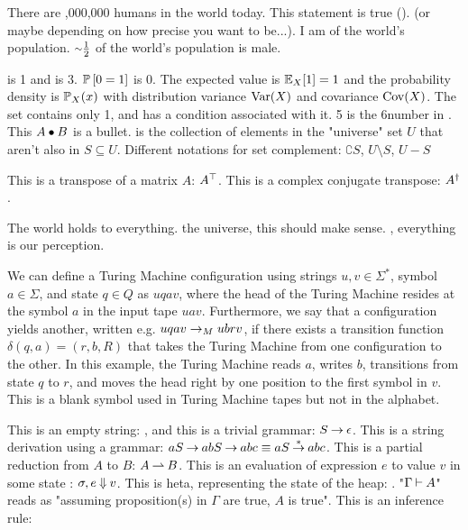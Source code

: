 \documentclass{article}
\begin{document}
\begin{solution}
    \par There are ,000,000 humans in the world today. This statement is true (\true). (or maybe \false depending on how precise you want to be...). I am  of the world's population. $\approx\half$ of the world's population is male.
    \par {} is 1 and  is 3. $\operatorname{\mathbb{P}}{[0=1]}$ is 0. The expected value is $\operatorname{\mathbb{E}}_{X}[1] = 1$ and the probability density is $\operatorname{\mathbb{P}}_{X}(x)$ with distribution variance $\operatorname{Var}(X)$ and covariance $\operatorname{Cov}(X)$. The set  contains only 1, and  has a condition associated with it. 5 is the 6\th number in \N. This $A \mathbin{\bullet} B$ is a bullet.  is the collection of elements in the "universe" set $U$ that aren't also in $S \subseteq U$. Different notations for set complement: $\complement{S}$, $U \setminus S$, $U - S$\\
    \par This is a transpose of a matrix $A$: ${A}^\top$. This is a complex conjugate transpose: ${A}^\dagger$.
    \par The world holds \WLOG to everything. \Wrt the universe, this should make sense. \Wlog, everything is  \wrt our perception.

    \par We can define a Turing Machine configuration using strings $u,v \in \Sigma^*$, symbol $a \in \Sigma$, and state $q \in Q$ as $uqav$, where the head of the Turing Machine resides at the symbol $a$ in the input tape $uav$. Furthermore, we say that a configuration yields another, written e.g. $uqav \rightarrow_M ubrv$, if there exists a transition function $\delta(q, a) = (r, b, R)$ that takes the Turing Machine from one configuration to the other. In this example, the Turing Machine reads $a$, writes $b$, transitions from state $q$ to $r$, and moves the head right by one position to the first symbol in $v$. This \blanksymbol is a blank symbol used in Turing Machine tapes but not in the alphabet.
    \par This is an empty string: \emptystring, and this is a trivial grammar: $S \mathbin{\rightarrow} \epsilon$. This is a string derivation using a grammar: $aS \mathbin{\rightarrow} abS \mathbin{\rightarrow} abc \equiv aS \mathbin{\overset{*}{\rightarrow}} abc$. This is a partial reduction from $A$ to $B$: $A \mathbin{\rightharpoonup} B$. This is an evaluation of expression $e$ to value $v$ in some state \state: $\sigma, e \mathbin{\Downarrow} v$. This is heta, representing the state of the heap: \heap. "$\Gamma \mathbin{\vdash} A$" reads as "assuming proposition(s) in $\Gamma$ are true, $A$ is true".
    This is an inference rule:
    

\end{solution}
\end{document}
